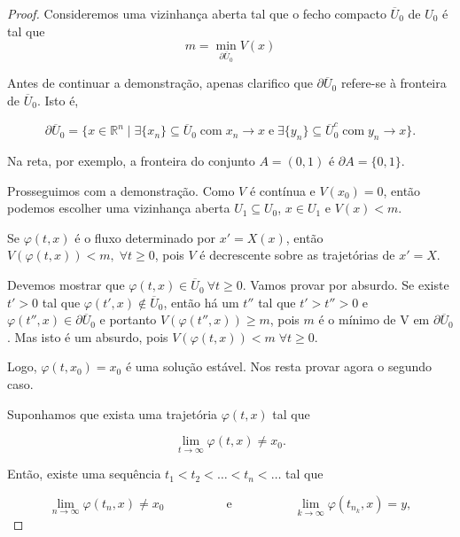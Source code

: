 \documentclass[
	12pt,				%
	openright,			%
	twoside,			%
	a4paper,			%
	english,			%
	french,				%
	spanish,			%
	brazil				%
	]{abntex2}
\newcommand{\espaco}{\hspace{5em}}
\newcommand{\R}{\mathbb{R}}
\newcommand{\Fi}{\varphi}
\newcommand{\Ubarrao}{\overline{U}_0}
\begin{document}
\begin{proof}
	Consideremos uma vizinhança aberta tal que o fecho compacto $\overline{U}_0$ de
	$U_0$ é tal que
		\begin{equation*}
			m = \min_{\partial \overline{U}_0} V(x)
		\end{equation*}

	Antes de continuar a demonstração, apenas clarifico que $\partial \overline{U}_0$
	refere-se à fronteira de $\overline{U}_0$. Isto é,

	\begin{equation}
		\partial \overline{U}_0 = \{x \in \R^n \; | \; \exists \{x_n\} \subseteq \overline{U}_0
			\; \text{com} \; x_n \to x \; \text{e} \; \exists \{y_n\} \subseteq \overline{U}_0^c \; \text{com} \;  y_n \to x\}.
	\end{equation}

	Na reta, por exemplo, a fronteira do conjunto $A = (0, 1)$ é $\partial A = \{0, 1\}$.

	Prosseguimos com a demonstração. Como $V$ é contínua e $V(x_0) = 0$, então podemos escolher uma vizinhança aberta
	$U_1 \subseteq U_0$, $x \in U_1$ e $V(x) < m$.

	Se $\Fi(t, x)$ é o fluxo determinado por $x' = X(x)$, então $V(\Fi(t, x)) < m,
	\; \forall t \geq 0$, pois $V$ é decrescente sobre as trajetórias de $x' = X$.

	Devemos mostrar que $\Fi(t, x) \in \overline{U}_0 \ \forall t \geq 0$.
	Vamos provar por absurdo. Se existe $t' > 0$
	tal que $\Fi(t', x) \notin \Ubarrao$, então há um $t''$ tal que $t' > t'' > 0$
	e $\Fi(t'', x) \in \partial \Ubarrao$ e portanto $V(\Fi(t'', x)) \geq m$,
	pois $m$ é o mínimo de V em $\partial \Ubarrao$. Mas isto é um absurdo, pois
	$V(\Fi(t, x)) < m \; \forall t \geq 0$.

	Logo, $\Fi(t, x_0) = x_0$ é uma solução estável. Nos resta provar agora o segundo caso.

	Suponhamos que exista uma trajetória $\Fi(t, x)$ tal que

	\begin{equation*}
		\lim_{t \to \infty} \Fi(t, x) \neq x_0.
	\end{equation*}

	Então, existe uma sequência $t_1 < t_2 < \ldots < t_n < \ldots$ tal que

	\begin{equation*}
		\lim_{n \to \infty} \Fi(t_n, x) \neq x_0 \espaco \text{e} \espaco \lim_{k \to \infty} \Fi(t_{n_k}, x) = y,
	\end{equation*}


\end{proof}
\end{document}
